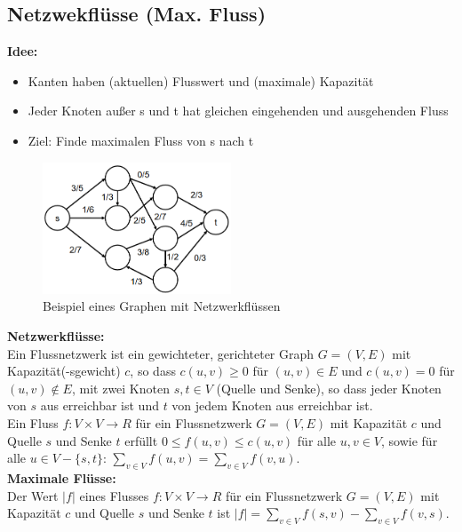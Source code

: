 \documentclass{article}
\begin{document}
        \subsection{Netzwekflüsse (Max. Fluss)}
            \textbf{Idee:} 
            \begin{itemize}
                \item Kanten haben (aktuellen) Flusswert und (maximale) Kapazität
                \item Jeder Knoten außer s und t hat gleichen eingehenden und ausgehenden Fluss
                \item Ziel: Finde maximalen Fluss von s nach t
            \end{itemize}
            \begin{figure}[ht]
                \centering
                \includegraphics[width=0.5\textwidth]{Bilder/NWFluesse.png}
                \caption{Beispiel eines Graphen mit Netzwerkflüssen}
                \label{fig:NWFluesse}
            \end{figure}
            \newpage
            \textbf{Netzwerkflüsse:}\\
            Ein Flussnetzwerk ist ein gewichteter, gerichteter Graph $G=(V,E)$ mit Kapazität(-sgewicht) $c$, so dass $c(u,v) \geq 0$ für $(u,v)\in E$ und $c(u,v) = 0$ für $(u,v)\notin E$, mit zwei Knoten $s,t \in V$ (Quelle und Senke), so dass jeder Knoten von $s$ aus erreichbar ist und $t$ von jedem Knoten aus erreichbar ist.\\
            Ein Fluss $f:V\times V\rightarrow R$  für ein Flussnetzwerk $G=(V,E)$ mit Kapazität $c$ und Quelle $s$ und Senke $t$ erfüllt $0 \leq f(u,v) \leq c(u,v)$ für alle $u,v \in V$, sowie für alle $u\in V-\{s,t\}$: $\sum_{v\in V} f(u,v) = \sum_{v\in V}f(v,u)$.\\
            
            \textbf{Maximale Flüsse:}\\
            Der Wert $|f|$ eines Flusses $f:V\times V \rightarrow R$ für ein Flussnetzwerk $G=(V,E)$ mit Kapazität $c$ und Quelle $s$ und Senke $t$ ist $|f|=\sum_{v\in V}f(s,v)-\sum_{v\in V}f(v,s)$.\\
            
\end{document}
